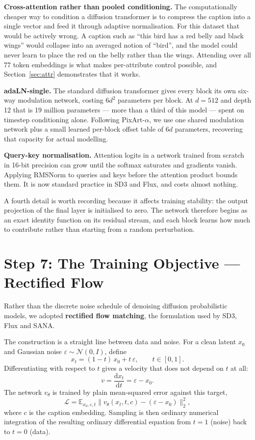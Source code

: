 \documentclass[11pt,a4paper]{article}
\newcommand{\step}[1]{\section{#1}}
\begin{document}
\textbf{Cross-attention rather than pooled conditioning.} The computationally
cheaper way to condition a diffusion transformer is to compress the caption into
a single vector and feed it through adaptive normalisation. For this dataset
that would be actively wrong. A caption such as ``this bird has a red belly and
black wings'' would collapse into an averaged notion of ``bird'', and the model
could never learn to place the red on the belly rather than the wings. Attending
over all 77 token embeddings is what makes per-attribute control possible, and
Section~\ref{sec:attr} demonstrates that it works.

\textbf{adaLN-single.} The standard diffusion transformer gives every block its
own six-way modulation network, costing $6d^2$ parameters per block. At $d=512$
and depth 12 that is 19 million parameters --- more than a third of this model
--- spent on timestep conditioning alone. Following PixArt-$\alpha$, we use one
shared modulation network plus a small learned per-block offset table of $6d$
parameters, recovering that capacity for actual modelling.

\textbf{Query-key normalisation.} Attention logits in a network trained from
scratch in 16-bit precision can grow until the softmax saturates and gradients
vanish. Applying RMSNorm to queries and keys before the attention product bounds
them. It is now standard practice in SD3 and Flux, and costs almost nothing.

A fourth detail is worth recording because it affects training stability: the
output projection of the final layer is initialised to zero. The network
therefore begins as an exact identity function on its residual stream, and each
block learns how much to contribute rather than starting from a random
perturbation.

\step{Step 7: The Training Objective --- Rectified Flow}

Rather than the discrete noise schedule of denoising diffusion probabilistic
models, we adopted \textbf{rectified flow matching}, the formulation used by
SD3, Flux and SANA.

The construction is a straight line between data and noise. For a clean latent
$x_0$ and Gaussian noise $\varepsilon \sim \mathcal{N}(0, I)$, define
\begin{equation}
x_t = (1-t)\,x_0 + t\,\varepsilon, \qquad t \in [0,1].
\end{equation}
Differentiating with respect to $t$ gives a velocity that does not depend on $t$
at all:
\begin{equation}
v = \frac{\mathrm{d}x_t}{\mathrm{d}t} = \varepsilon - x_0 .
\end{equation}
The network $v_\theta$ is trained by plain mean-squared error against this
target,
\begin{equation}
\mathcal{L} = \mathbb{E}_{x_0,\varepsilon,t}\big\lVert v_\theta(x_t, t, c) - (\varepsilon - x_0) \big\rVert_2^2 ,
\end{equation}
where $c$ is the caption embedding. Sampling is then ordinary numerical
integration of the resulting ordinary differential equation from $t=1$ (noise)
back to $t=0$ (data).
\end{document}
